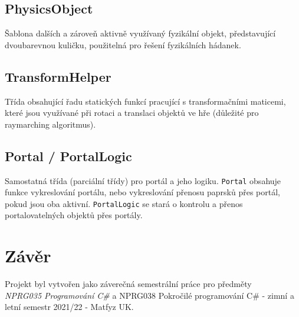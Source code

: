 \documentclass[a4paper, 12pt]{article}
\begin{document}
\subsection{PhysicsObject}
Šablona dalších a zároveň aktivně využívaný fyzikální objekt, představující
dvoubarevnou kuličku, použitelná pro řešení fyzikálních hádanek.

\subsection{TransformHelper}
Třída obsahující řadu statických funkcí pracující s transformačními maticemi, 
které jsou využívané při rotaci a translaci objektů ve hře (důležité pro
raymarching algoritmus).

\subsection{Portal / PortalLogic}
Samostatná třída (parciální třídy) pro portál a jeho logiku. \texttt{Portal}
obsahuje funkce vykreslování portálu, nebo vykreslování přenosu paprsků přes
portál, pokud jsou oba aktivní. \texttt{PortalLogic} se stará o kontrolu a
přenos portalovatelných objektů přes portály.

\section{Závěr}
Projekt byl vytvořen jako záverečná semestrální práce pro předměty
\\\emph{NPRG035 Programování C\#} a {NPRG038 Pokročilé programování C\#} -
zimní a letní semestr 2021/22 - Matfyz UK.
\end{document}
